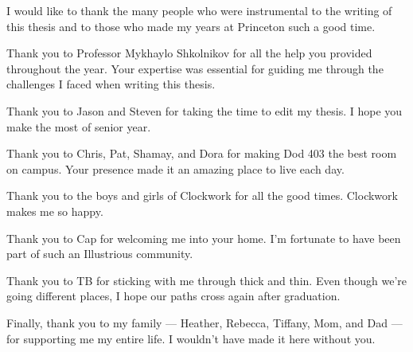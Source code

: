 I would like to thank the many people who were instrumental to the writing of this thesis and to those who made my years at Princeton such a good time.
\newline

Thank you to Professor Mykhaylo Shkolnikov for all the help you provided throughout the year. Your expertise was essential for guiding me through the challenges I faced when writing this thesis.
\newline

Thank you to Jason and Steven for taking the time to edit my thesis. I hope you make the most of senior year.
\newline

Thank you to Chris, Pat, Shamay, and Dora for making Dod 403 the best room on campus. Your presence made it an amazing place to live each day.
\newline

Thank you to the boys and girls of Clockwork for all the good times. Clockwork makes me so happy.
\newline

Thank you to Cap for welcoming me into your home. I'm fortunate to have been part of such an Illustrious community.
\newline

Thank you to TB for sticking with me through thick and thin. Even though we're going different places, I hope our paths cross again after graduation.
\newline

Finally, thank you to my family --- Heather, Rebecca, Tiffany, Mom, and Dad --- for supporting me my entire life. I wouldn't have made it here without you.



